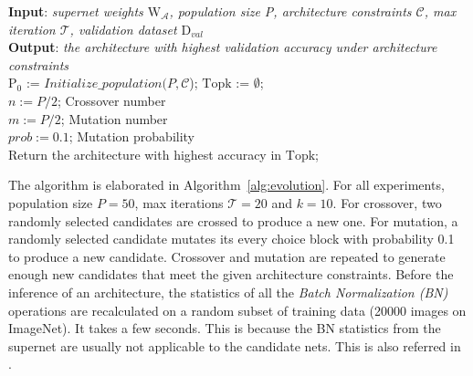 \begin{algorithm}[ht]\small
\textbf{Input}: \emph{supernet weights $\mathrm{W}_\mathcal{A}$, population size P, architecture constraints $\mathcal{C}$, max iteration $\mathcal{T}$, validation dataset $\mathrm{D}_{val}$} \\
\textbf{Output}: \emph{the architecture with highest validation accuracy under architecture constraints} \\
$\mathrm{P}_0$ := $Initialize\_population(P, \mathcal{C}$); $\mathrm{Topk}$ := $\emptyset$; \\
$n := P / 2$;  \hfill Crossover number \\
$m := P / 2$;  \hfill Mutation number \\
$prob := 0.1$; \hfill Mutation probability \\
Return the architecture with highest accuracy in $\mathrm{Topk}$;
\caption{Evolutionary Architecture Search}
\label{alg:evolution}
\end{algorithm}

The algorithm is elaborated in Algorithm~\ref{alg:evolution}. For all experiments, population size $P=50$, max iterations $\mathcal{T}=20$ and $k=10$. For crossover, two randomly selected candidates are crossed to produce a new one. For mutation, a randomly selected candidate mutates its every choice block with probability 0.1 to produce a new candidate. Crossover and mutation are repeated to generate enough new candidates that meet the given architecture constraints. Before the inference of an architecture, the statistics of all the \emph{Batch Normalization (BN)} \cite{ioffe2015batch} operations are recalculated on a random subset of training data (20000 images on ImageNet). It takes a few seconds. This is because the BN statistics from the supernet are usually not applicable to the candidate nets. This is also referred in \cite{bender2018understanding}.

